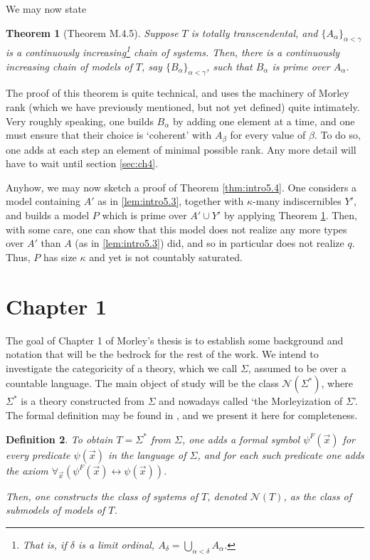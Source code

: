 \documentclass{article}
\newtheorem{theorem}{Theorem}[section]
\newtheorem{definition}[theorem]{Definition}
\theoremstyle{nonumberplain}
\newcommand{\calN}{\mathcal{N}}
\begin{document}
We may now state
\begin{theorem}[Theorem M.4.5]\label{thm:intro4.5}
Suppose $T$ is totally transcendental, and $\{A_\alpha\}_{\alpha < \gamma}$ is a continuously increasing\footnote{That is, if $\delta$ is a limit ordinal, $A_\delta = \bigcup_{\alpha < \delta} A_\alpha$.} chain of systems. Then, there is a continuously increasing chain of models of $T$, say $\{B_\alpha\}_{\alpha < \gamma}$, such that $B_\alpha$ is prime over $A_\alpha$.
\end{theorem}

The proof of this theorem is quite technical, and uses the machinery of Morley rank (which we have previously mentioned, but not yet defined) quite intimately. Very roughly speaking, one builds $B_\alpha$ by adding one element at a time, and one must ensure that their choice is `coherent' with $A_\beta$ for every value of $\beta$. To do so, one adds at each step an element of minimal possible rank. Any more detail will have to wait until section \ref{sec:ch4}.

Anyhow, we may now sketch a proof of Theorem \ref{thm:intro5.4}. One considers a model containing $A'$ as in \ref{lem:intro5.3}, together with $\kappa$-many indiscernibles $Y'$, and builds a model $P$ which is prime over $A' \cup Y'$ by applying Theorem \ref{thm:intro4.5}. Then, with some care, one can show that this model does not realize any more types over $A'$ than $A$ (as in \ref{lem:intro5.3}) did, and so in particular does not realize $q$. Thus, $P$ has size $\kappa$ and yet is not countably saturated.

\section{Chapter 1}\label{sec:ch1}

The goal of Chapter 1 of Morley's thesis is to establish some background and notation that will be the bedrock for the rest of the work. We intend to investigate the categoricity of a theory, which we call $\Sigma$, assumed to be over a countable language. The main object of study will be the class $\calN(\Sigma^*)$, where $\Sigma^*$ is a theory constructed from $\Sigma$ and nowadays called `the Morleyization of $\Sigma$'. The formal definition may be found in \cite{morley}, and we present it here for completeness.

\begin{definition}
To obtain $T = \Sigma^*$ from $\Sigma$, one adds a formal symbol $\psi^F(\vec x)$ for every predicate $\psi(\vec x)$ in the language of $\Sigma$, and for each such predicate one adds the axiom $\forall_{\vec x} (\psi^F(\vec x) \leftrightarrow \psi(\vec x))$.

Then, one constructs the class of \emph{systems of $T$}, denoted $\calN(T)$, as the class of submodels of models of $T$.
\end{definition}
\end{document}
